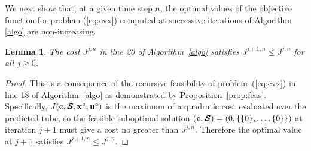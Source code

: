 \documentclass[a4paper, 10 pt, conference]{IEEEconf}
\newtheorem{lemma}[theorem]{Lemma}
\def\bc{{\bf c}}
\def\bS{\boldsymbol{\mathcal{S}}}
\begin{document}

We next show that, at a given time step $n$, the optimal values of the objective function for problem (\ref{eq:cvx}) computed at successive iterations of Algorithm \ref{algo} are non-increasing.

\begin{lemma}\label{lem:convergence}
The cost $J^{j,n}$ in line 20 of Algorithm~\ref{algo} satisfies  
$J^{j+1,n} \leq J^{j,n}$ for all $j\geq 0$.
\end{lemma}

\begin{proof}
This is a consequence of the recursive feasibility of problem~(\ref{eq:cvx}) in line 18 of Algorithm~\ref{algo} as demonstrated by Proposition~\ref{prop:feas}. Specifically, %
$J(\bc,\bS,{\bf x}^\circ,{\bf u}^\circ)$ is the maximum of a quadratic cost evaluated over the predicted tube, so the feasible suboptimal solution $(\bc,\bS) = (0,\{\{0\},\ldots,\{0\}\})$ at iteration $j+1$ must give a cost no greater than $J^{j,n}$. Therefore the optimal value at $j+1$ satisfies $J^{j+1,n} \leq J^{j,n}$.

\end{proof}
\end{document}
